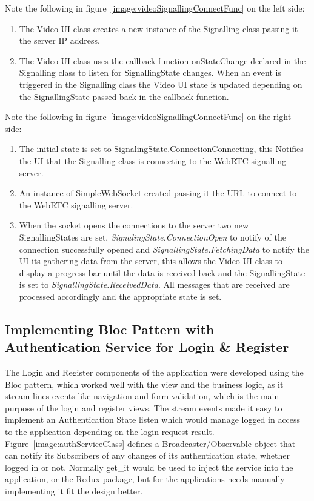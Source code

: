 Note the following in figure~\ref{image:videoSignallingConnectFunc} on the left side:
\begin{enumerate}
	\item The Video UI class creates a new instance of the Signalling class passing it the server IP address.
	\item The Video UI class uses the callback function onStateChange declared in the Signalling class to listen for SignallingState changes. When an event is triggered in the Signalling class the Video UI state is updated depending on the SignallingState passed back in the callback function.
\end{enumerate}

Note the following in figure~\ref{image:videoSignallingConnectFunc} on the right side:
\begin{enumerate}
	\item The initial state is set to SignalingState.ConnectionConnecting, this Notifies the UI that the Signalling class is connecting to the WebRTC signalling server.
	\item An instance of SimpleWebSocket created passing it the URL to connect to the WebRTC signalling server.
    \item When the socket opens the connections to the server two new SignallingStates are set, \textit{SignalingState.ConnectionOpen} to notify of the connection successfully opened and \textit{SignallingState.FetchingData} to notify the UI its gathering data from the server, this allows the Video UI class to display a progress bar until the data is received back and the SignallingState is set to \textit{SignallingState.ReceivedData}. All messages that are received are processed accordingly and the appropriate state is set.
\end{enumerate}

\subsection{Implementing Bloc Pattern with Authentication Service for Login \& Register}
The Login and Register components of the application were developed using the Bloc pattern, which worked well with the view and the business logic, as it stream-lines events like navigation and form validation, which is the main purpose of the login and register views. The stream events made it easy to implement an Authentication State listen which would manage logged in access to the application depending on the login request result.
\\ Figure~\ref{image:authServiceClass} defines a Broadcaster/Observable object that can notify its Subscribers of any changes of its authentication state, whether logged in or not. Normally get\_it would be used to inject the service into the application, or the Redux package, but for the applications needs manually implementing it fit the design better.

